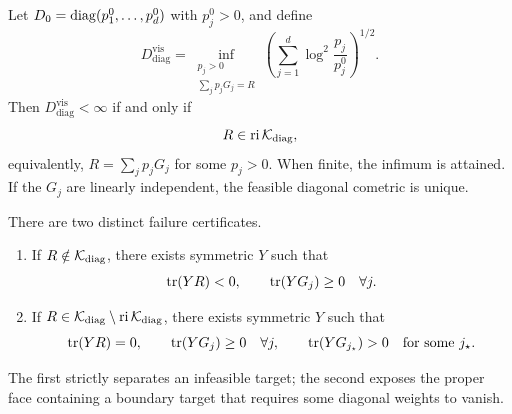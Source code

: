 \begin{theorem}
\label{thm:diagonal-expressivity}
\mbox{}\par\noindent
Let \(D_0=\operatorname{diag}(p_1^0,\ldots,p_d^0)\) with \(p_j^0>0\), and define
\begin{equation}
  D_{\mathrm{diag}}^{\mathrm{vis}}
  =
  \inf_{\substack{p_j>0\\\sum_jp_jG_j=R}}
  \left(\sum_{j=1}^d\log^2\frac{p_j}{p_j^0}\right)^{1/2}.
  \label{eq:diagonal-complexity}
\end{equation}
Then \(D_{\mathrm{diag}}^{\mathrm{vis}}<\infty\) if and only if
\begin{equation}
  R\in\operatorname{ri}\mathcal K_{\mathrm{diag}},
  \label{eq:diagonal-ri}
\end{equation}
equivalently, \(R=\sum_jp_jG_j\) for some \(p_j>0\).  When finite, the
infimum is attained.  If the \(G_j\) are linearly independent, the feasible
diagonal cometric is unique.

There are two distinct failure certificates.
\begin{enumerate}[label=(\roman*),leftmargin=*]
  \item If \(R\notin\mathcal K_{\mathrm{diag}}\), there exists symmetric \(Y\)
  such that
  \[
    \operatorname{tr}(YR)<0,
    \qquad
    \operatorname{tr}(YG_j)\ge0\quad\forall j.
  \]
  \item If
  \(R\in\mathcal K_{\mathrm{diag}}\setminus\operatorname{ri}\mathcal K_{\mathrm{diag}}\), there
  exists symmetric \(Y\) such that
  \[
    \operatorname{tr}(YR)=0,
    \qquad
    \operatorname{tr}(YG_j)\ge0\quad\forall j,
    \qquad
    \operatorname{tr}(YG_{j_\star})>0\quad\text{for some }j_\star.
  \]
\end{enumerate}
The first strictly separates an infeasible target; the second exposes the
proper face containing a boundary target that requires some diagonal weights
to vanish.
\end{theorem}

